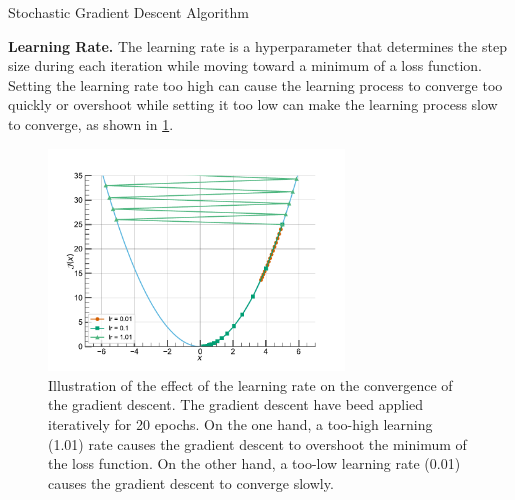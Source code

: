 \begin{algorithm}
  \caption{Stochastic Gradient Descent Algorithm}
  \label{alg:dlo:sgd}
  \begin{algorithmic}
    \ENDWHILE
  \end{algorithmic}
\end{algorithm}


\noindent \textbf{Learning Rate.} The learning rate is a hyperparameter that
determines the step size during each iteration while moving toward a minimum of
a loss function. Setting the learning rate too high can cause the learning
process to converge too quickly or overshoot while setting it too low can make
the learning process slow to converge, as shown in
\cref{fig:dlo:gradient_descent}.\\

\begin{figure}[htbp]
  \centering
  \includegraphics[width=0.7\textwidth]{chapter_dlo/assets/gradient_descent.pdf}
  \caption{Illustration of the effect of the learning rate on the convergence of
    the gradient descent. The gradient descent have beed applied iteratively for
    20 epochs. On the one hand, a too-high learning (1.01) rate causes the
    gradient descent to overshoot the minimum of the loss function. On the other
    hand, a too-low learning rate (0.01) causes the gradient descent to converge
    slowly.}
  \label{fig:dlo:gradient_descent}
\end{figure}

